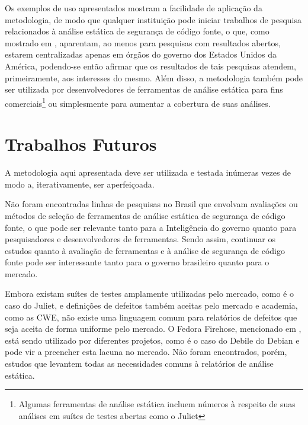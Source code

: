 Os exemplos de uso apresentados mostram a facilidade de aplicação da metodologia, de modo que qualquer instituição pode iniciar trabalhos de pesquisa relacionados à análise estática de segurança de código fonte, o que, como mostrado em , aparentam, ao menos para pesquisas com resultados abertos, estarem centralizadas apenas em órgãos do governo dos Estados Unidos da América, podendo-se então afirmar que os resultados de tais pesquisas atendem, primeiramente, aos interesses do mesmo. Além disso, a metodologia também pode ser utilizada por desenvolvedores de ferramentas de análise estática para fins comerciais\footnote{Algumas ferramentas de análise estática incluem números à respeito de suas análises em suítes de testes abertas como o Juliet} ou simplesmente para aumentar a cobertura de suas análises.

\section*{Trabalhos Futuros}

A metodologia aqui apresentada deve ser utilizada e testada inúmeras vezes de modo a, iterativamente, ser aperfeiçoada.

Não foram encontradas linhas de pesquisas no Brasil que envolvam avaliações ou métodos de seleção de ferramentas de análise estática de segurança de código fonte, o que pode ser relevante tanto para a Inteligência do governo quanto para pesquisadores e desenvolvedores de ferramentas. Sendo assim, continuar os estudos quanto à avaliação de ferramentas e à análise de segurança de código fonte pode ser interessante tanto para o governo brasileiro quanto para o mercado.

Embora existam suítes de testes amplamente utilizadas pelo mercado, como é o caso do Juliet, e definições de defeitos também aceitas pelo mercado e academia, como as CWE, não existe uma linguagem comum para relatórios de defeitos que seja aceita de forma uniforme pelo mercado. O Fedora Firehose, mencionado em , está sendo utilizado por diferentes projetos, como é o caso do Debile do Debian e pode vir a preencher esta lacuna no mercado. Não foram encontrados, porém, estudos que levantem todas as necessidades comuns à relatórios de análise estática.

